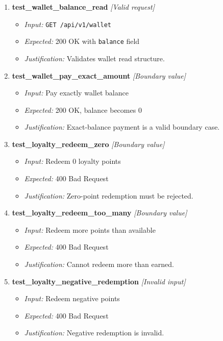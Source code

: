 \documentclass{article}
\begin{document}
\begin{enumerate}[resume, label=\textbf{TC\arabic*.}]
\item \textbf{test\_wallet\_balance\_read} \textit{[Valid request]}
\begin{itemize}[noitemsep]
  \item \textit{Input:} \texttt{GET /api/v1/wallet}
  \item \textit{Expected:} 200 OK with \texttt{balance} field
  \item \textit{Justification:} Validates wallet read structure.
\end{itemize}

\item \textbf{test\_wallet\_pay\_exact\_amount} \textit{[Boundary value]}
\begin{itemize}[noitemsep]
  \item \textit{Input:} Pay exactly wallet balance
  \item \textit{Expected:} 200 OK, balance becomes 0
  \item \textit{Justification:} Exact-balance payment is a valid boundary case.
\end{itemize}

\item \textbf{test\_loyalty\_redeem\_zero} \textit{[Boundary value]}
\begin{itemize}[noitemsep]
  \item \textit{Input:} Redeem 0 loyalty points
  \item \textit{Expected:} 400 Bad Request
  \item \textit{Justification:} Zero-point redemption must be rejected.
\end{itemize}

\item \textbf{test\_loyalty\_redeem\_too\_many} \textit{[Boundary value]}
\begin{itemize}[noitemsep]
  \item \textit{Input:} Redeem more points than available
  \item \textit{Expected:} 400 Bad Request
  \item \textit{Justification:} Cannot redeem more than earned.
\end{itemize}

\item \textbf{test\_loyalty\_negative\_redemption} \textit{[Invalid input]}
\begin{itemize}[noitemsep]
  \item \textit{Input:} Redeem negative points
  \item \textit{Expected:} 400 Bad Request
  \item \textit{Justification:} Negative redemption is invalid.
\end{itemize}
\end{enumerate}
\end{document}
